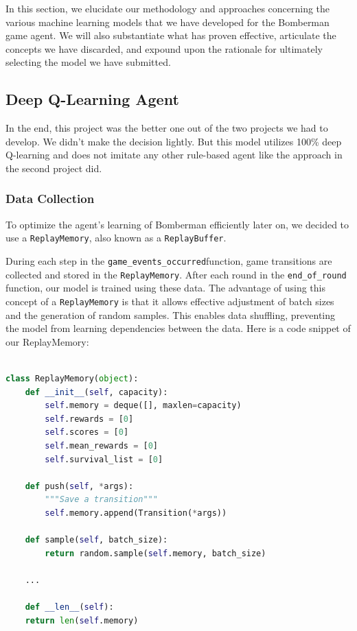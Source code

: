 
In this section, we elucidate our methodology and approaches concerning the various machine learning models 
that we have developed for the Bomberman game agent. We will also substantiate what has proven effective, articulate 
the concepts we have discarded, and expound upon the rationale for ultimately selecting the model we have submitted.


\subsection{Deep Q-Learning Agent}

In the end, this project was the better one out of the two projects we had to develop. We didn't make the decision lightly. 
But this model utilizes 100\% deep Q-learning and does not imitate any other rule-based agent like the approach in the second project did.


\subsubsection{Data Collection}

To optimize the agent's learning of Bomberman efficiently later on, we decided to use a \verb|ReplayMemory|, also known as a \verb|ReplayBuffer|. 

During each step in the \verb|game_events_occurred|function, game transitions are collected and stored in the \verb|ReplayMemory|.
After each round in the \verb|end_of_round| function, 
our model is trained using these data. The advantage of using this concept of a \verb|ReplayMemory| is that it allows effective adjustment of 
batch sizes and the generation of random samples. This enables data shuffling, preventing the model from learning dependencies between the data. 
Here is a code snippet of our ReplayMemory:

\begin{lstlisting}[language=Python]

class ReplayMemory(object):
    def __init__(self, capacity):
        self.memory = deque([], maxlen=capacity)
        self.rewards = [0]
        self.scores = [0]
        self.mean_rewards = [0]
        self.survival_list = [0]

    def push(self, *args):
        """Save a transition"""
        self.memory.append(Transition(*args))

    def sample(self, batch_size):
        return random.sample(self.memory, batch_size)
    
    ...

    def __len__(self):
    return len(self.memory)  

\end{lstlisting}

